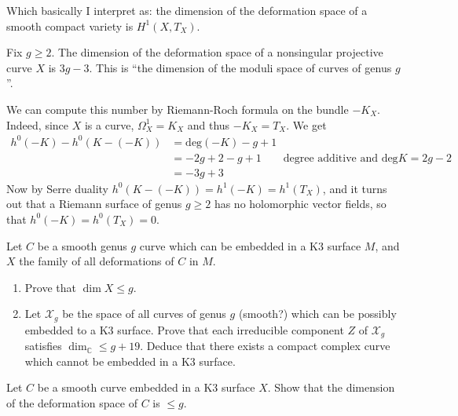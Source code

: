 Which basically I interpret as: the dimension of the deformation space of a
smooth compact variety is $H^{1}(X,T_X)$.

\begin{example}
\label{example-moduli-space-of-nonsingular-Riemann-surfaces-of-genus-g}
\begin{reference}
\cite[Example 3.1]{continued-fractions}
\end{reference}
Fix $g \geq 2$. The dimension of the deformation space of a nonsingular
projective curve $X$ is $3g-3$. This is ``the dimension of the moduli space of
curves of genus $g$''.
 
We can compute this number by Riemann-Roch formula on the bundle $-K_X$. 
Indeed, since $X$ is a curve, $\Omega_X^1=K_X$ and thus $-K_X=T_X$. We get
\begin{align*}
h^0(-K)-h^0(K-(-K))&=\text{deg}(-K)-g+1\\
&=-2g+2-g+1\qquad \text{degree additive and $\text{deg}K=2g-2$}\\
&=-3g+3
\end{align*}
Now by Serre duality $h^0(K-(-K))=h^1(-K)=h^1(T_X)$, and it turns out that a
Riemann surface of genus $g \geq 2$ has no holomorphic vector fields, so that
$h^0(-K)=h^0(T_X)=0$.
\end{example}

\begin{exercise}
\label{exercise-deformations-of-curves-in-K3}
Let $C$ be a smooth genus $g$ curve which can be embedded in a K3 surface  $M$,
and $X$ the family of all deformations of $C$ in $M$.
\begin{enumerate}
\item Prove that $\dim X \leq  g$.
\item Let $\mathcal{X}_g$ be the space of all curves of genus $g$ (smooth?)
which can be possibly embedded to a K3 surface. Prove that each irreducible
component $Z$ of $\mathcal{X}_g$ satisfies $\dim_\mathbb{C} \leq  g+19$. Deduce
that there exists a compact complex curve which cannot be embedded in a K3
surface.
\end{enumerate}
\end{exercise}

\begin{exercise}
\label{exercise-}
Let $C$ be a smooth curve embedded in a K3 surface $X$. Show that the dimension
of the deformation space of $C$ is $\leq g$.
\end{exercise}

